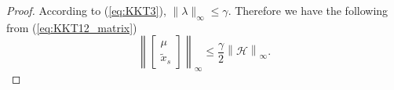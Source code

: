 \documentclass[12pt]{article}
\newcommand{\Nc}{{\mathcal{N}}}
\newcommand{\Hc}{{\mathcal{H}}}
\newtheorem*{proof}{\textbf{Proof}}
\begin{document}
\begin{proof}

According to (\ref{eq:KKT3}), $\|\lambda\|_\infty \leq \gamma$. 
Therefore we have the following from (\ref{eq:KKT12_matrix})
\begin{equation}\label{eq:mu_xs_bounded}
	\left\|\begin{bmatrix}
		\mu \\ \tilde{x}_s 
	\end{bmatrix}\right\|_\infty
\leq \frac{\gamma}{2}
 \left\|\Hc\right\|_\infty.
\end{equation}


\end{proof}
\end{document}
